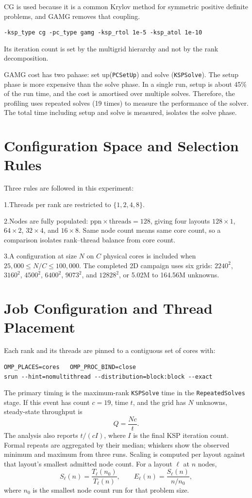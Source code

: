\documentclass[12pt,a4paper,notitlepage]{report}
\begin{document}
CG is used because it is a common Krylov method for symmetric positive definite problems, 
and GAMG removes that coupling. 
\begin{verbatim}
-ksp_type cg -pc_type gamg -ksp_rtol 1e-5 -ksp_atol 1e-10
\end{verbatim}
Its iteration count is set by the multigrid hierarchy and not
by the rank decomposition.


GAMG cost has two pahase: set up(\texttt{PCSetUp}) and solve (\texttt{KSPSolve}). 
The setup phase is more expensive than the solve phase. In a single run, setup is about 45\% of the run time,
and the cost is amortised over multiple solves. 
Therefore, the profiling uses repeated solves (19 times) to measure the performance of the solver. 
The total time including setup and solve is measured,  isolates the solve phase.



\section{Configuration Space and Selection Rules}
\label{sec:configspace}
Three rules are followed in this experiment:

1.Threads per rank are restricted to $\{1,2,4,8\}$. 

2.Nodes are fully populated: $\text{ppn} \times \text{threads} = 128$, giving four layouts
$128\times1$, $64\times2$, $32\times4$, and $16\times8$. Same node count means same core
count, so a comparison isolates rank--thread balance from core count.

3.A configuration at size $N$ on $C$ physical cores is included when
$25{,}000 \leq N/C \leq 100{,}000$. The completed 2D campaign uses six grids:
$2240^2$, $3160^2$, $4500^2$, $6400^2$, $9073^2$, and $12828^2$, or 5.02M to
164.56M unknowns.



\section{Job Configuration and Thread Placement}
\label{sec:placement}
Each rank and its threads are pinned to a contiguous set of cores with:
\begin{verbatim}
OMP_PLACES=cores   OMP_PROC_BIND=close
srun --hint=nomultithread --distribution=block:block --exact
\end{verbatim}

The primary timing is the maximum-rank \texttt{KSPSolve} time in the
\texttt{RepeatedSolves} stage. If this event has count $c=19$, time $t$, and the grid has
$N$ unknowns, steady-state throughput is
\[
  Q = \frac{Nc}{t}.
\]
The analysis also reports $t/(cI)$, where $I$ is the final KSP iteration count. Formal
repeats are aggregated by their median; whiskers show the observed minimum and maximum
from three runs. Scaling is computed per layout against that layout's smallest admitted
node count. For a layout $\ell$ at $n$ nodes,
\[
  S_\ell(n) = \frac{T_\ell(n_0)}{T_\ell(n)}, \qquad
  E_\ell(n) = \frac{S_\ell(n)}{n/n_0},
\]
where $n_0$ is the smallest node count run for that problem size.
\end{document}
